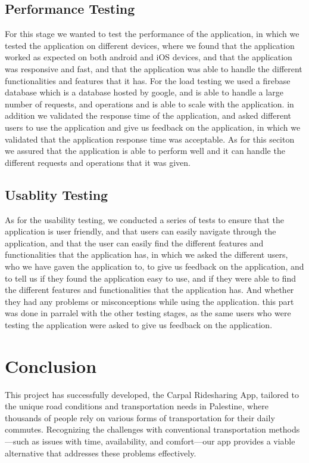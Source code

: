 \documentclass[a4paper, 12pt]{report} %
\begin{document}
        \subsection{Performance Testing}
            For this stage we wanted to test the performance of the application, in which we tested the application on different devices, where we found that the application worked as expected on both android and iOS devices, and that the application was responsive and fast, and that the application was able to handle the different functionalities and features that it has.
            For the load testing we used a firebase database which is a database hosted by google, and is able to handle a large number of requests, and operations and is able to scale with the application.
            in addition we validated the response time of the application, and asked different users to use the application and give us feedback on the application, in which we validated that the application response time was acceptable.
            As for this seciton we assured that the application is able to perform well and it can handle the different requests and operations that it was given.
        \subsection{Usablity Testing}
        As for the usability testing, we conducted a series of tests to ensure that the application is user friendly, and that users can easily navigate through the application, and that the user can easily find the different features and functionalities that the application has, in which we asked the different users, who we have gaven the application to, to give us feedback on the application, and to tell us if they found the application easy to use, and if they were able to find the different features and functionalities that the application has.
        And whether they had any problems or misconceptions while using the application. this part was done in parralel with the other testing stages, as the same users who were testing the application were asked to give us feedback on the application.
    \pagebreak
    \section{Conclusion}
        This project has successfully developed, the Carpal Ridesharing App, tailored to the unique road conditions and transportation needs in Palestine, where thousands of people rely on various forms of transportation for their daily commutes. Recognizing the challenges with conventional transportation methods—such as issues with time, availability, and comfort—our app provides a viable alternative that addresses these problems effectively.
\end{document}
